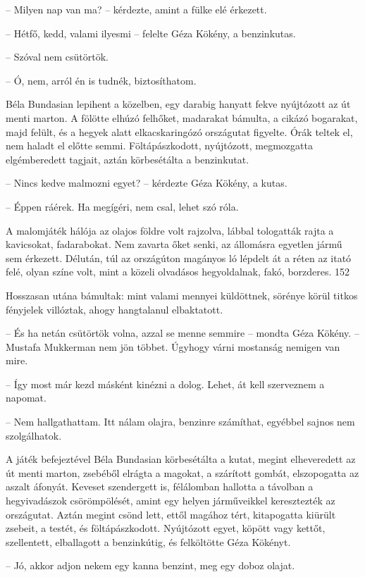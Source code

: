 \documentclass{IEEEtran}
\begin{document}
– Milyen nap van ma? – kérdezte, amint a fülke elé érkezett.

– Hétfő, kedd, valami ilyesmi – felelte Géza Kökény, a benzinkutas.

– Szóval nem csütörtök.

– Ó, nem, arról én is tudnék, biztosíthatom.

Béla Bundasian lepihent a közelben, egy darabig hanyatt fekve nyújtózott az út
menti marton. A fölötte elhúzó felhőket, madarakat bámulta, a cikázó
bogarakat, majd felült, és a hegyek alatt elkacskaringózó országutat figyelte.
Órák teltek el, nem haladt el előtte semmi. Föltápászkodott, nyújtózott,
megmozgatta elgémberedett tagjait, aztán körbesétálta a benzinkutat.

– Nincs kedve malmozni egyet? – kérdezte Géza Kökény, a kutas.

– Éppen ráérek. Ha megígéri, nem csal, lehet szó róla.

A malomjáték hálója az olajos földre volt rajzolva, lábbal tologatták rajta a
kavicsokat, fadarabokat. Nem zavarta őket senki, az állomásra egyetlen jármű
sem érkezett. Délután, túl az országúton magányos ló lépdelt át a réten az
itató felé, olyan színe volt, mint a közeli olvadásos hegyoldalnak, fakó,
borzderes.
152

Hosszasan utána bámultak: mint valami mennyei küldöttnek, sörénye körül titkos
fényjelek villóztak, ahogy hangtalanul elbaktatott.

– És ha netán csütörtök volna, azzal se menne semmire – mondta Géza Kökény. –
Mustafa Mukkerman nem jön többet. Úgyhogy várni mostanság nemigen van mire.

– Így most már kezd másként kinézni a dolog. Lehet, át kell szerveznem a
napomat.

– Nem hallgathattam. Itt nálam olajra, benzinre számíthat, egyébbel sajnos nem
szolgálhatok.

A játék befejeztével Béla Bundasian körbesétálta a kutat, megint elheveredett
az út menti marton, zsebéből elrágta a magokat, a szárított gombát,
elszopogatta az aszalt áfonyát. Keveset szendergett is, félálomban hallotta a
távolban a hegyivadászok csörömpölését, amint egy helyen járműveikkel
keresztezték az országutat. Aztán megint csönd lett, ettől magához tért,
kitapogatta kiürült zsebeit, a testét, és föltápászkodott. Nyújtózott egyet,
köpött vagy kettőt, szellentett, elballagott a benzinkútig, és felköltötte
Géza Kökényt.

– Jó, akkor adjon nekem egy kanna benzint, meg egy doboz olajat.
\end{document}
